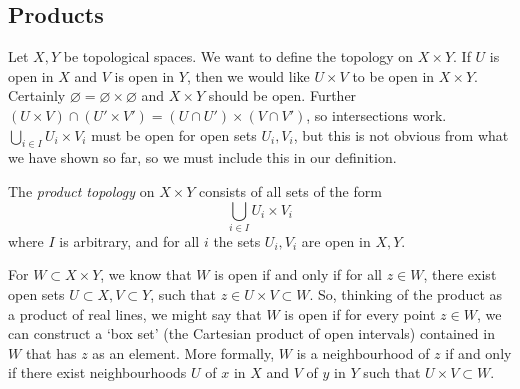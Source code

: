 \subsection{Products}
Let \( X, Y \) be topological spaces.
We want to define the topology on \( X \times Y \).
If \( U \) is open in \( X \) and \( V \) is open in \( Y \), then we would like \( U \times V \) to be open in \( X \times Y \).
Certainly \( \varnothing = \varnothing \times \varnothing \) and \( X \times Y \) should be open.
Further \( (U \times V) \cap (U' \times V') = (U \cap U') \times (V \cap V') \), so intersections work.
\( \bigcup_{i \in I} U_i \times V_i \) must be open for open sets \( U_i, V_i \), but this is not obvious from what we have shown so far, so we must include this in our definition.
\begin{definition}
	The \textit{product topology} on \( X \times Y \) consists of all sets of the form
	\[
		\bigcup_{i \in I} U_i \times V_i
	\]
	where \( I \) is arbitrary, and for all \( i \) the sets \( U_i, V_i \) are open in \( X, Y \).
\end{definition}
\begin{remark}
	For \( W \subset X \times Y \), we know that \( W \) is open if and only if for all \( z \in W \), there exist open sets \( U \subset X, V \subset Y \), such that \( z \in U \times V \subset W \).
	So, thinking of the product as a product of real lines, we might say that \( W \) is open if for every point \( z \in W \), we can construct a `box set' (the Cartesian product of open intervals) contained in \( W \) that has \( z \) as an element.
	More formally, \( W \) is a neighbourhood of \( z \) if and only if there exist neighbourhoods \( U \) of \( x \) in \( X \) and \( V \) of \( y \) in \( Y \) such that \( U \times V \subset W \).
\end{remark}

